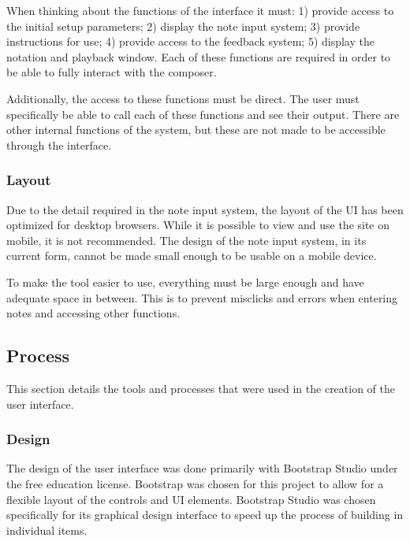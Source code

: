 When thinking about the functions of the interface it must: 1) provide access to the initial setup parameters; 2) display the note input system; 3) provide instructions for use; 4) provide access to the feedback system; 5) display the notation and playback window.  Each of these functions are required in order to be able to fully interact with the composer.

\vspace{\baselineskip}

Additionally, the access to these functions must be direct.  The user must specifically be able to call each of these functions and see their output.  There are other internal functions of the system, but these are not made to be accessible through the interface.

\subsubsection{Layout}
\label{subsubsec:methodologylayout}

Due to the detail required in the note input system, the layout of the UI has been optimized for desktop browsers.  While it is possible to view and use the site on mobile, it is not recommended.  The design of the note input system, in its current form, cannot be made small enough to be usable on a mobile device.

\vspace{\baselineskip}

To make the tool easier to use, everything must be large enough and have adequate space in between.  This is to prevent misclicks and errors when entering notes and accessing other functions.

\subsection{Process}
\label{subsec:process}

This section details the tools and processes that were used in the creation of the user interface.

\subsubsection{Design}
\label{subsubsec:processdesign}

The design of the user interface was done primarily with Bootstrap Studio under the free education license.  Bootstrap was chosen for this project to allow for a flexible layout of the controls and UI elements.  Bootstrap Studio was chosen specifically for its graphical design interface to speed up the process of building in individual items.

